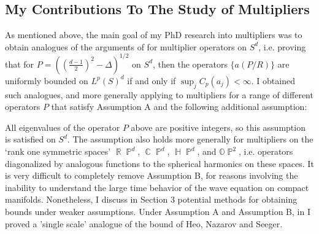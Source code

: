 \documentclass[11pt]{article}
\DeclareMathOperator{\RR}{\mathbb{R}}
\DeclareMathOperator{\HH}{\mathbb{H}}
\DeclareMathOperator{\CC}{\mathbb{C}}
\DeclareMathOperator{\PP}{\mathbb{P}}
\begin{document}




\subsection{My Contributions To The Study of Multipliers} \label{ContributionMultipliers}

As mentioned above, the main goal of my PhD research into multipliers was to obtain analogues of the arguments of \cite{HeoNazarovSeeger,Cladek,KimQuasiradial} for multiplier operators on $S^d$, i.e. proving that for $P = ( ({\scriptstyle \frac{d-1}{2} })^2 - \Delta )^{1/2}$ on $S^d$, then the operators $\{ a(P/R) \}$ are uniformly bounded on $L^p(S)^d$ if and only if $\sup_j C_p(a_j) < \infty$. I obtained such analogues, and more generally applying to multipliers for a range of different operators $P$ that satisfy Assumption A and the following additional assumption:
%
\begin{center}
\end{center}
%
All eigenvalues of the operator $P$ above are positive integers, so this assumption is satisfied on $S^d$. The assumption also holds more generally for multipliers on the `rank one symmetric spaces' $\RR \PP^d$, $\CC \PP^d$, $\HH \PP^d$, and $\mathbb{O} \PP^2$, i.e. operators diagonalized by analogous functions to the spherical harmonics on these spaces. It is very difficult to completely remove Assumption B, for reasons involving the inability to understand the large time behavior of the wave equation on compact manifolds. Nonetheless, I discuss in Section 3 potential methods for obtaining bounds under weaker assumptions. Under Assumption A and Assumption B, in \cite{DensonCharacterization} I proved a 'single scale' analogue of the bound of Heo, Nazarov and Seeger.
\end{document}
